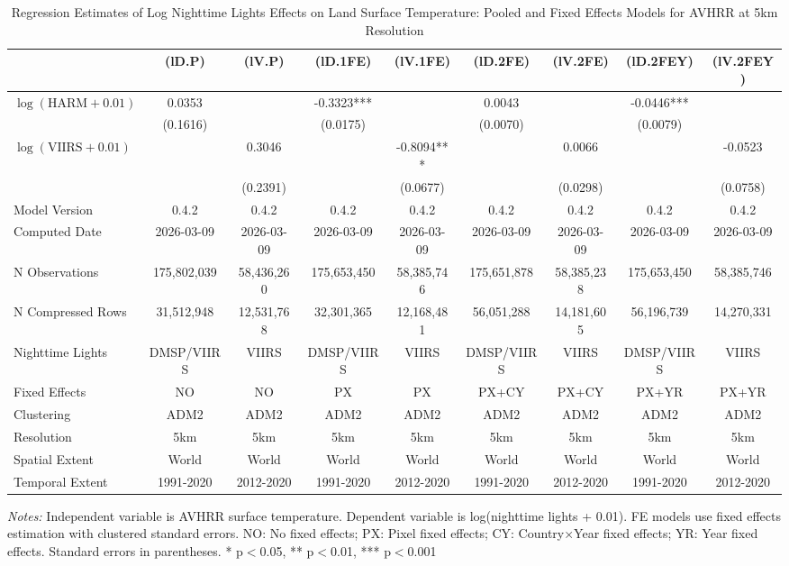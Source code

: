 \begin{table}[htbp]
\centering
\footnotesize
\caption{Regression Estimates of Log Nighttime Lights Effects on Land Surface Temperature: Pooled and Fixed Effects Models for AVHRR at 5km Resolution}
\begin{tabular}{lcccccccc}
\toprule
 & (lD.P) & (lV.P) & (lD.1FE) & (lV.1FE) & (lD.2FE) & (lV.2FE) & (lD.2FEY) & (lV.2FEY) \\
\midrule
$\log(\text{HARM} + 0.01)$ & 0.0353 &  & -0.3323*** &  & 0.0043 &  & -0.0446*** &  \\
 & (0.1616) &  & (0.0175) &  & (0.0070) &  & (0.0079) &  \\
$\log(\text{VIIRS} + 0.01)$ &  & 0.3046 &  & -0.8094*** &  & 0.0066 &  & -0.0523 \\
 &  & (0.2391) &  & (0.0677) &  & (0.0298) &  & (0.0758) \\
\midrule
Model Version & 0.4.2 & 0.4.2 & 0.4.2 & 0.4.2 & 0.4.2 & 0.4.2 & 0.4.2 & 0.4.2 \\
Computed Date & 2026-03-09 & 2026-03-09 & 2026-03-09 & 2026-03-09 & 2026-03-09 & 2026-03-09 & 2026-03-09 & 2026-03-09 \\
N Observations & 175,802,039 & 58,436,260 & 175,653,450 & 58,385,746 & 175,651,878 & 58,385,238 & 175,653,450 & 58,385,746 \\
N Compressed Rows & 31,512,948 & 12,531,768 & 32,301,365 & 12,168,481 & 56,051,288 & 14,181,605 & 56,196,739 & 14,270,331 \\
\midrule
Nighttime Lights & DMSP/VIIRS & VIIRS & DMSP/VIIRS & VIIRS & DMSP/VIIRS & VIIRS & DMSP/VIIRS & VIIRS \\
Fixed Effects & NO & NO & PX & PX & PX+CY & PX+CY & PX+YR & PX+YR \\
Clustering & ADM2 & ADM2 & ADM2 & ADM2 & ADM2 & ADM2 & ADM2 & ADM2 \\
Resolution & 5km & 5km & 5km & 5km & 5km & 5km & 5km & 5km \\
Spatial Extent & World & World & World & World & World & World & World & World \\
Temporal Extent & 1991-2020 & 2012-2020 & 1991-2020 & 2012-2020 & 1991-2020 & 2012-2020 & 1991-2020 & 2012-2020 \\
\bottomrule
\end{tabular}
\begin{threeparttable}
\begin{tablenotes}\small
\item \textit{Notes:} Independent variable is AVHRR surface temperature. Dependent variable is log(nighttime lights + 0.01). FE models use  fixed effects estimation with clustered standard errors. NO: No fixed effects; PX: Pixel fixed effects; CY: Country×Year fixed effects; YR: Year fixed effects. Standard errors in parentheses. * p$<$0.05, ** p$<$0.01, *** p$<$0.001
\end{tablenotes}
\end{threeparttable}
\end{table}